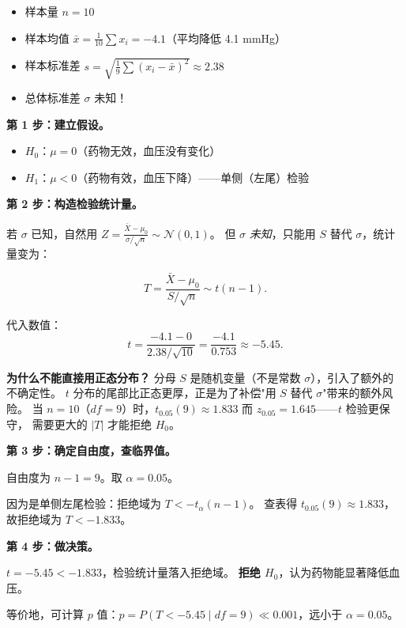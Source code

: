 \begin{itemize}
    \item 样本量 $n = 10$
    \item 样本均值 $\bar{x} = \frac{1}{10}\sum x_i = -4.1$（平均降低 4.1 mmHg）
    \item 样本标准差 $s = \sqrt{\frac{1}{9}\sum (x_i - \bar{x})^2} \approx 2.38$
    \item 总体标准差 $\sigma$ 未知！
\end{itemize}

\textbf{第 1 步：建立假设。}

\begin{itemize}
    \item $H_0$：$\mu = 0$（药物无效，血压没有变化）
    \item $H_1$：$\mu < 0$（药物有效，血压下降）\quad ——单侧（左尾）检验
\end{itemize}

\textbf{第 2 步：构造检验统计量。}

若 $\sigma$ 已知，自然用 $Z = \frac{\bar{X} - \mu_0}{\sigma/\sqrt{n}} \sim \mathcal{N}(0,1)$。
但 $\sigma$ \emph{未知}，只能用 $S$ 替代 $\sigma$，统计量变为：

\begin{equation}
    \boxed{T = \frac{\bar{X} - \mu_0}{S / \sqrt{n}} \sim t(n-1)}.
\end{equation}

代入数值：
\begin{equation}
    t = \frac{-4.1 - 0}{2.38 / \sqrt{10}} = \frac{-4.1}{0.753} \approx -5.45.
\end{equation}

\textbf{为什么不能直接用正态分布？} 分母 $S$ 是随机变量（不是常数 $\sigma$），引入了额外的不确定性。
$t$ 分布的尾部比正态更厚，正是为了补偿"用 $S$ 替代 $\sigma$"带来的额外风险。
当 $n = 10$（$df = 9$）时，$t_{0.05}(9) \approx 1.833$ 而 $z_{0.05} = 1.645$——$t$ 检验更保守，
需要更大的 $|T|$ 才能拒绝 $H_0$。

\textbf{第 3 步：确定自由度，查临界值。}

自由度为 $n - 1 = 9$。取 $\alpha = 0.05$。

因为是单侧左尾检验：拒绝域为 $T < -t_{\alpha}(n-1)$。
查表得 $t_{0.05}(9) \approx 1.833$，故拒绝域为 $T < -1.833$。

\textbf{第 4 步：做决策。}

$t = -5.45 < -1.833$，检验统计量落入拒绝域。
\textbf{拒绝 $H_0$}，认为药物能显著降低血压。

等价地，可计算 $p$ 值：$p = P(T < -5.45 \mid df=9) \ll 0.001$，远小于 $\alpha = 0.05$。

